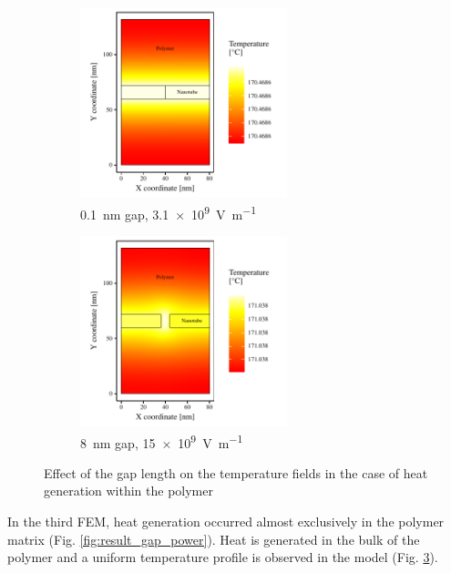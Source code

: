 \documentclass[11pt,review,times]{elsarticle}
\begin{document}
\begin{figure}[htb]
	\centering
	\begin{subfigure}{60mm}
		\centering
		\captionsetup{width=55mm}
		\includegraphics[width=60mm]{resultats_0,1nm_comsol_2D_temp}
		\caption{\SI{0.1}{\nano\metre} gap, \SI{3.1e9}{\volt\per\metre}}
		\label{fig:result_gap01nm_temp}		
	\end{subfigure} 
	\begin{subfigure}{60mm}
		\centering
		\captionsetup{width=55mm}
		\includegraphics[width=60mm]{resultats_8nm_comsol_2D_temp}
		\caption{\SI{8}{\nano\metre} gap, \SI{15e9}{\volt\per\metre}}
		\label{fig:result_gap8nm_temp}		
	\end{subfigure}
	\caption{Effect of the gap length on the temperature fields in the case of heat generation within the polymer}
	\label{fig:result_gap_temp}
\end{figure}

In the third FEM, heat generation occurred almost exclusively in the polymer matrix (Fig. \ref{fig:result_gap_power}). 
Heat is generated in the bulk of the polymer and a uniform temperature profile is observed in the model (Fig. \ref{fig:result_gap_temp}). 

\FloatBarrier
\end{document}
